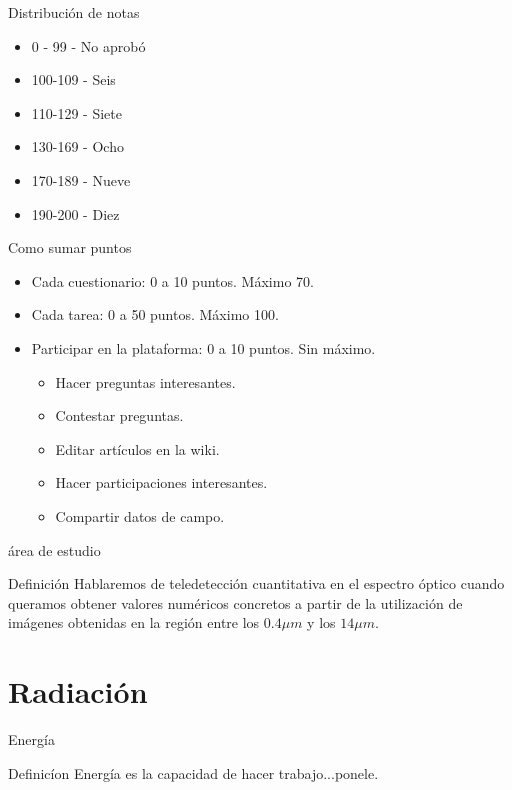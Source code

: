 \documentclass[]{beamer}
\begin{document}
\begin{frame}{Distribución de notas}
  \begin{itemize}
    \item 0 - 99 - No aprobó
    \item 100-109 - Seis
    \item 110-129 - Siete
    \item 130-169 - Ocho
    \item 170-189 - Nueve
    \item 190-200 - Diez
  \end{itemize}
\end{frame}

\begin{frame}{Como sumar puntos}
  \begin{itemize}[<+>]
    \item Cada cuestionario: 0 a 10 puntos. Máximo 70.
    \item Cada tarea: 0 a 50 puntos. Máximo 100.
    \item Participar en la plataforma: 0 a 10 puntos. Sin máximo.
    \begin{itemize}
      \item Hacer preguntas interesantes.
      \item Contestar preguntas.
      \item Editar artículos en la wiki.
      \item Hacer participaciones interesantes.
      \item Compartir datos de campo.
    \end{itemize}
  \end{itemize}
\end{frame}

\begin{frame}{área de estudio}
  \begin{block}{Definición}
    Hablaremos de teledetección cuantitativa en el espectro óptico cuando queramos obtener valores numéricos concretos a partir de la utilización de imágenes obtenidas en la región entre los $0.4\mu m$ y los $14\mu m$.
  \end{block}
\end{frame}

\section{Radiación}
\label{sec:radiacion}
\begin{frame}{Energía}
  \begin{block}{Definicíon}
    Energía es la capacidad de hacer trabajo...\pause ponele.
  \end{block}
\end{frame}
\end{document}
